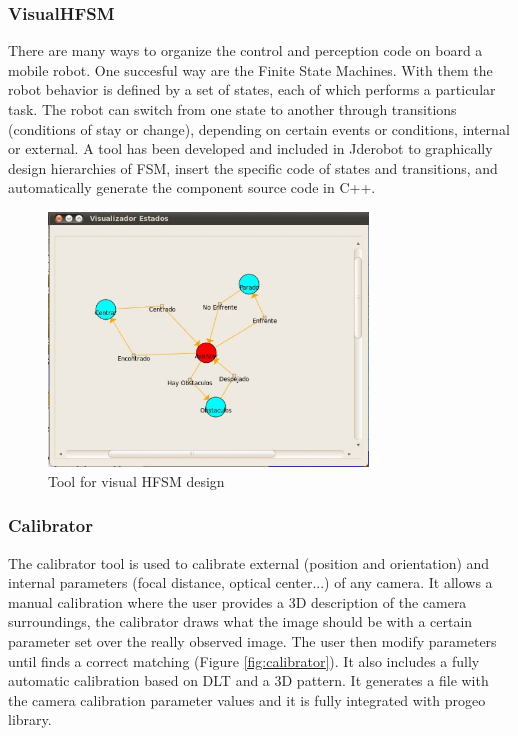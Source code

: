 \documentclass[twocolumn]{svjour3}          %
\begin{document}
\subsubsection{VisualHFSM}

There are many ways to organize the control and perception code on board a mobile robot. One succesful way are the Finite State Machines. With them the robot behavior is defined by a set of states, each of which performs a particular task. The robot can switch from one state to another through transitions (conditions of stay or change), depending on certain events or conditions, internal or external. A tool has been developed and included in Jderobot to graphically design hierarchies of FSM, insert the specific code of states and transitions, and automatically generate the component source code in C++.

\begin{figure}[h!]
  \includegraphics[width=8.5cm]{figs/ratonGatoAutoEjec.jpg}
\caption{Tool for visual HFSM design}
\label{fig:visualHFSM}
\end{figure}

\subsubsection{Calibrator}

The calibrator tool is used to calibrate external (position and orientation) and internal parameters (focal distance, optical center...) of any camera. It allows a manual calibration where the user provides a 3D description of the camera surroundings, the calibrator draws what the image should be with a certain parameter set over the really observed image. The user then modify parameters until finds a correct matching (Figure \ref{fig:calibrator}). It also includes a fully automatic calibration based on DLT and a 3D pattern. It generates a file with the camera calibration parameter values and it is fully integrated with progeo library.
\end{document}
